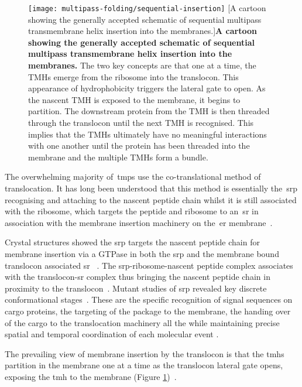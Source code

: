 \begin{figure}[!ht]
\centering
\texttt{[image: multipass-folding/sequential-insertion]}
        [A cartoon showing the generally accepted schematic of sequential multipass transmembrane helix insertion into the membranes.]{\textbf{A cartoon showing the generally accepted schematic of sequential multipass transmembrane helix insertion into the membranes.}
        The two key concepts are that one at a time, the TMHs emerge from the ribosome into the translocon.
        This appearance of hydrophobicity triggers the lateral gate to open.
        As the nascent TMH is exposed to the membrane, it begins to partition.
        The downstream protein from the TMH is then threaded through the translocon until the next TMH is recognised.
        This implies that the TMHs ultimately have no meaningful interactions with one another until the protein has been threaded into the membrane and the multiple TMHs form a bundle.
}
\label{fig:sequential-insertion}
\end{figure}

The overwhelming majority of~\gls{tmp}s use the co-translational method of translocation.
It has long been understood that this method is essentially the~\gls{srp} recognising and attaching to the nascent peptide chain whilst it is still associated with the ribosome, which targets the peptide and ribosome to an~\gls{sr} in association with the membrane insertion machinery on the~\gls{er} membrane~\cite{Pool2005, Hessa2005}.

Crystal structures showed the \gls{srp} targets the nascent peptide chain for membrane insertion via a GTPase in both the \gls{srp} and the membrane bound translocon associated \gls{sr} ~\cite{Shan2005}.
The \gls{srp}\--ribosome\--nascent peptide complex associates with the translocon\--\gls{sr} complex thus bringing the nascent peptide chain in proximity to the translocon~\cite{Shan2005}.
Mutant studies of \gls{srp} revealed key discrete conformational stages~\cite{Shan2005}.
These are the specific recognition of signal sequences on cargo proteins, the targeting of the package to the membrane, the handing over of the cargo to the translocation machinery all the while maintaining precise spatial and temporal coordination of each molecular event \cite{Saraogi2011}.


The prevailing view of membrane insertion by the translocon is that the \gls{tmh}s partition in the membrane one at a time as the translocon lateral gate opens, exposing the \gls{tmh} to the membrane (Figure \ref{fig:sequential-insertion})~\cite{Cymer2015}.

